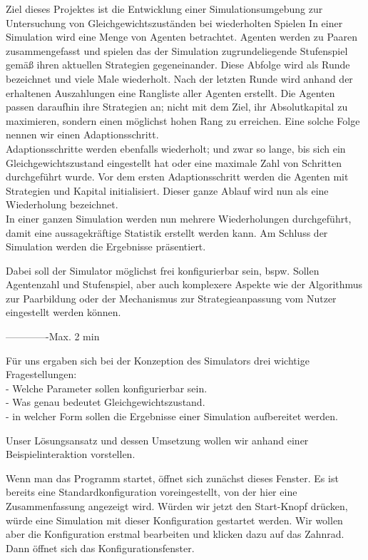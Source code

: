 \documentclass[parskip=full,11pt]{scrartcl}
\begin{document}
Ziel dieses Projektes ist die Entwicklung einer Simulationsumgebung zur Untersuchung von Gleichgewichtszuständen bei wiederholten Spielen
In einer Simulation wird eine Menge von Agenten betrachtet.
Agenten werden zu Paaren zusammengefasst und spielen das der Simulation zugrundeliegende Stufenspiel gemäß ihren aktuellen Strategien gegeneinander. Diese Abfolge wird als Runde bezeichnet und viele Male wiederholt. Nach der letzten Runde wird anhand der erhaltenen Auszahlungen eine Rangliste aller Agenten erstellt. Die Agenten passen daraufhin ihre Strategien an; nicht mit dem Ziel, ihr Absolutkapital zu maximieren, sondern einen möglichst hohen Rang zu erreichen. Eine solche Folge nennen wir einen Adaptionsschritt.\\
Adaptionsschritte werden ebenfalls wiederholt; und zwar so lange, bis sich ein Gleichgewichtszustand eingestellt hat oder eine maximale Zahl von Schritten durchgeführt wurde. Vor dem ersten Adaptionsschritt werden die Agenten mit Strategien und Kapital initialisiert. Dieser ganze Ablauf wird nun als eine Wiederholung bezeichnet.\\
In einer ganzen Simulation werden nun mehrere Wiederholungen durchgeführt, damit eine aussagekräftige Statistik erstellt werden kann. Am Schluss der Simulation werden die Ergebnisse präsentiert.

Dabei soll der Simulator möglichst frei konfigurierbar sein, bspw. Sollen Agentenzahl und Stufenspiel, aber auch komplexere Aspekte wie der Algorithmus zur Paarbildung oder der Mechanismus zur Strategieanpassung vom Nutzer eingestellt werden können.

-------------Max. 2 min

Für uns ergaben sich bei der Konzeption des Simulators drei wichtige Fragestellungen:\\
 - Welche Parameter sollen konfigurierbar sein.\\
 - Was genau bedeutet Gleichgewichtszustand.\\
 - in welcher Form sollen die Ergebnisse einer Simulation aufbereitet werden.

Unser Lösungsansatz und dessen Umsetzung wollen wir anhand einer Beispielinteraktion vorstellen.

Wenn man das Programm startet, öffnet sich zunächst dieses Fenster. Es ist bereits eine Standardkonfiguration voreingestellt, von der hier eine Zusammenfassung angezeigt wird. Würden wir jetzt den Start-Knopf drücken, würde eine Simulation mit dieser Konfiguration gestartet werden. Wir wollen aber die Konfiguration erstmal bearbeiten und klicken dazu auf das Zahnrad. Dann öffnet sich das Konfigurationsfenster.
\end{document}
